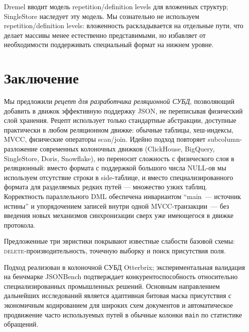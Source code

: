 \documentclass[conference,a4paper,10pt]{IEEEtran}
\begin{document}
Dremel \cite{dremel} вводит модель repetition/definition levels для
вложенных структур; SingleStore наследует эту модель. Мы
сознательно не используем repetition/definition levels:
вложенность раскладывается на отдельные пути, что делает массивы
менее естественно представимыми, но избавляет от необходимости
поддерживать специальный формат на нижнем уровне.

\section{Заключение}

Мы предложили \emph{рецепт для разработчика реляционной СУБД},
позволяющий добавить в движок эффективную поддержку JSON, не
переписывая физический слой хранения. Рецепт использует только
стандартные абстракции, доступные практически в любом реляционном
движке: обычные таблицы, хеш-индексы, MVCC, физические операторы
scan/join. Идейно подход повторяет subcolumn-разложение современных
колоночных движков (ClickHouse, BigQuery, SingleStore, Doris,
Snowflake), но переносит сложность с физического слоя в реляционный:
вместо формата с поддержкой большого числа NULL-ов мы используем
отсутствие строки в side-таблице, и вместо специализированного
формата для разделяемых редких путей --- множество узких таблиц.
Корректность параллельного DML обеспечена инвариантом
``main~--- источник истины'' и упорядочением записей внутри одной
MVCC-транзакции~--- без введения новых механизмов синхронизации сверх
уже имеющегося в движке протокола.

Предложенные три эвристики покрывают известные слабости базовой
схемы: \textsc{delete}-производительность,
точечную выборку и поиск присутствия поля.

Подход реализован в колоночной СУБД Otterbrix; экспериментальная
валидация на бенчмарке JSONBench подтверждает конкурентоспособность
относительно специализированных промышленных решений. Основным
направлением дальнейших исследований является адаптивная битовая
маска присутствия с экономичным кодированием для широких схем
документов и автоматическое продвижение часто используемых путей в
обычные колонки \texttt{main} по статистике обращений.



\end{document}
